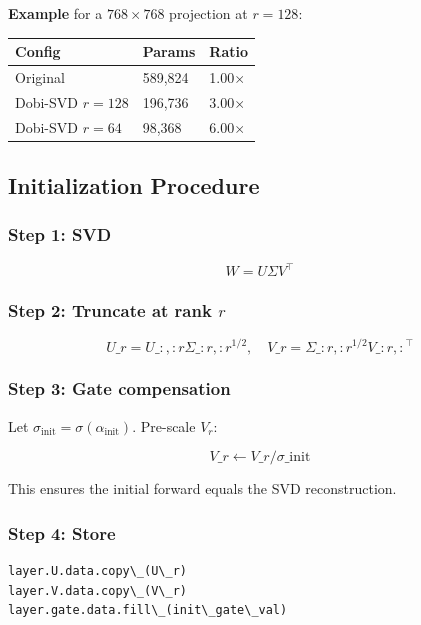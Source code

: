 \textbf{Example} for a $768 \times 768$ projection at $r = 128$:

\begin{table}[H]
\centering
\small
\begin{tabular}{lll}
\toprule
\textbf{Config} & \textbf{Params} & \textbf{Ratio} \\
\midrule
Original & 589,824 & 1.00$\times$ \\
Dobi-SVD $r=128$ & 196,736 & 3.00$\times$ \\
Dobi-SVD $r=64$ & 98,368 & 6.00$\times$ \\
\bottomrule
\end{tabular}
\end{table}

\subsection{Initialization Procedure}

\subsubsection{Step 1: SVD}

\[
W = U \Sigma V^\top
\tag{4.2}
\]

\subsubsection{Step 2: Truncate at rank $r$}

\[
U\_r = U\_{:, :r} \Sigma\_{:r, :r}^{1/2}, \quad
V\_r = \Sigma\_{:r, :r}^{1/2} V\_{:r, :}^\top
\tag{4.3}
\]

\subsubsection{Step 3: Gate compensation}

Let $\sigma_\text{init} = \sigma(\alpha_\text{init})$. Pre-scale $V_r$:

\[
V\_r \leftarrow V\_r / \sigma\_\text{init}
\tag{4.4}
\]

This ensures the initial forward equals the SVD reconstruction.

\subsubsection{Step 4: Store}

\begin{lstlisting}
layer.U.data.copy\_(U\_r)
layer.V.data.copy\_(V\_r)
layer.gate.data.fill\_(init\_gate\_val)
\end{lstlisting}

